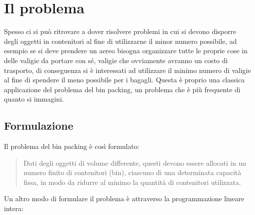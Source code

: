 \section{Il problema}
Spesso ci si può ritrovare a dover risolvere problemi in cui si devono disporre degli oggetti in contenitori al fine
di utilizzarne il minor numero possibile, ad esempio se si deve prendere un aereo bisogna organizzare tutte le proprie cose in delle
valigie da portare con sé, valigie che ovviamente avranno un costo di trasporto, di conseguenza si è interessati ad
utilizzare il minimo numero di valigie al fine di spendere il meno possibile per i bagagli. Questa è proprio una
classica applicazione del problema del bin packing, un problema che è più frequente di quanto si immagini.

\subsection{Formulazione}
Il problema del bin packing è così formulato:
\begin{quote}
	Dati degli oggetti di volume differente, questi devono essere allocati in un numero finito di
	contenitori (bin), ciascuno di una determinata capacità fissa, in modo da ridurre al minimo la
	quantità di contenitori utilizzata.
\end{quote}
\noindent
Un altro modo di formulare il problema è attraverso la programmazione lineare intera:
